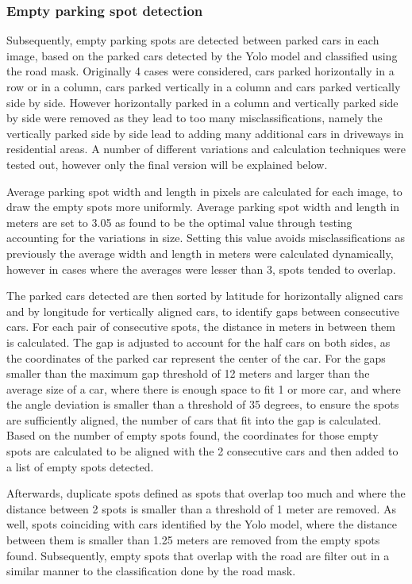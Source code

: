 \newpage

\subsubsection{Empty parking spot detection}
Subsequently, empty parking spots are detected between parked cars in each image, based on the parked cars detected by the Yolo model and classified using the road mask.
Originally 4 cases were considered, cars parked horizontally in a row or in a column, cars parked vertically in a column and cars parked vertically side by side. However horizontally parked in a column and vertically parked side by side were removed as they lead to too many misclassifications, namely the vertically parked side by side lead to adding many additional cars in driveways in residential areas.
A number of different variations and calculation techniques were tested out, however only the final version will be explained below.

Average parking spot width and length in pixels are calculated for each image, to draw the empty spots more uniformly. Average parking spot width and length in meters are set to 3.05 as found to be the optimal value through testing accounting for the variations in size.
Setting this value avoids misclassifications as previously the average width and length in meters were calculated dynamically, however in cases where the averages were lesser than 3, spots tended to overlap.

The parked cars detected are then sorted by latitude for horizontally aligned cars and by longitude for vertically aligned cars, to identify gaps between consecutive cars.
For each pair of consecutive spots, the distance in meters in between them is calculated. The gap is adjusted to account for the half cars on both sides, as the coordinates of the parked car represent the center of the car.
For the gaps smaller than the maximum gap threshold of 12 meters and larger than the average size of a car, where there is enough space to fit 1 or more car, and where the angle deviation is smaller than a threshold of 35 degrees, to ensure the spots are sufficiently aligned, the number of cars that fit into the gap is calculated.
Based on the number of empty spots found, the coordinates for those empty spots are calculated to be aligned with the 2 consecutive cars and then added to a list of empty spots detected.

Afterwards, duplicate spots defined as spots that overlap too much and where the distance between 2 spots is smaller than a threshold of 1 meter are removed.
As well, spots coinciding with cars identified by the Yolo model, where the distance between them is smaller than 1.25 meters are removed from the empty spots found.
Subsequently, empty spots that overlap with the road are filter out in a similar manner to the classification done by the road mask.

